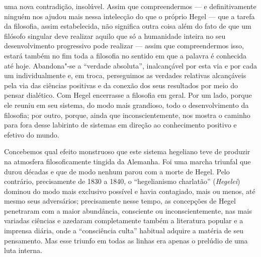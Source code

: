uma nova contradição, insolúvel. Assim que compreendermos --- e
definitivamente ninguém nos ajudou mais nessa intelecção do que o
próprio Hegel ---
que a tarefa da filosofia, assim estabelecida, não significa outra coisa
além do fato de que um filósofo singular deve realizar aquilo que só a
humanidade inteira no seu desenvolvimento progressivo pode realizar ---
assim que compreendermos isso, estará também no fim toda a filosofia no
sentido em que a palavra é conhecida até hoje. Abandona"-se a ``verdade
absoluta'', inalcançável por esta via e por cada um individualmente e,
em troca, perseguimos as verdades relativas alcançáveis pela via das
ciências positivas e da conexão dos seus resultados por meio do pensar
dialético.
Com Hegel
encerrasse a filosofia em geral. Por um lado, porque ele reuniu em seu
sistema, do modo mais grandioso, todo o desenvolvimento da filosofia;
por outro, porque, ainda que inconscientemente, nos mostra o caminho
para fora desse labirinto de sistemas em direção ao conhecimento
positivo e efetivo do mundo.

Concebemos qual efeito monstruoso que este sistema hegeliano teve de
produzir na atmosfera filosoficamente tingida da Alemanha. Foi uma
marcha triunfal que durou décadas e que de modo nenhum parou com a morte
de Hegel.
Pelo contrário, precisamente de 1830 a 1840, o ``hegelianismo
charlatão'' (\emph{Hegelei}) dominou do modo mais exclusivo possível e
havia contagiado, mais ou menos, até mesmo seus adversários;
precisamente nesse tempo, as concepções
de Hegel penetraram
com a maior abundância, consciente ou inconscientemente, nas mais
variadas ciências e azedaram completamente também a literatura popular e
a imprensa diária, onde a ``consciência culta'' habitual adquire a
matéria de seu pensamento. Mas esse triunfo em todas as linhas era
apenas o prelúdio de uma luta interna.

